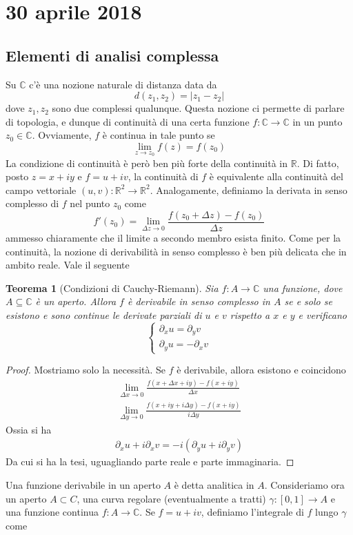 \documentclass[a4paper,11pt]{book}
\newcommand{\R}{\mathbb{R}}
\newcommand{\C}{\mathbb{C}}
\theoremstyle{theorem}
\newtheorem{teorema}{Teorema}[section]
\theoremstyle{definition}
\begin{document}
\section{30 aprile 2018}
\subsection{Elementi di analisi complessa}
Su $\C$ c'è una nozione naturale di distanza data da
\[d(z_1,z_2)=|z_1-z_2|\]
dove $z_1,z_2$ sono due complessi qualunque. Questa nozione ci permette di parlare di topologia, e dunque di continuità di una certa funzione $f\colon\C\to\C$ in un punto $z_0\in\C$. Ovviamente, $f$ è continua in tale punto se
\[\lim\limits_{z\to z_0}f(z)=f(z_0)\]
La condizione di continuità è però ben più forte della continuità in $\R$. Di fatto, posto $z=x+iy$ e $f=u+iv$, la continuità di $f$ è equivalente alla continuità del campo vettoriale $(u,v)\colon\R^2\to\R^2$. Analogamente, definiamo la derivata in senso complesso di $f$ nel punto $z_0$ come
\[f'(z_0)=\lim\limits_{\Delta z\to 0}\frac{f(z_0+\Delta z)-f(z_0)}{\Delta z}\]
ammesso chiaramente che il limite a secondo membro esista finito. Come per la continuità, la nozione di derivabilità in senso complesso è ben più delicata che in ambito reale. Vale il seguente
\begin{teorema}[Condizioni di Cauchy-Riemann]
	Sia $f\colon A\to\C$ una funzione, dove $A\subseteq\C$ è un aperto. Allora $f$ è derivabile in senso complesso in $A$ se e solo se esistono e sono continue le derivate parziali di $u$ e $v$ rispetto a $x$ e $y$ e verificano
	\[\begin{cases}
	\partial_xu=\partial_y{v}\\\partial_y{u}=-\partial_x{v}
	\end{cases}\]
\end{teorema}
\begin{proof}
	Mostriamo solo la necessità. Se $f$ è derivabile, allora esistono e coincidono
	\begin{align*}\lim\limits_{\Delta x\to 0}\frac{f(x+\Delta x+iy)-f(x+iy)}{\Delta x}\\\lim\limits_{\Delta y\to0}\frac{f(x+iy+i\Delta y)-f(x+iy)}{i\Delta y}\end{align*}
	Ossia si ha
	\begin{align*}
		\partial_xu+i\partial_xv=-i(\partial_yu+i\partial_yv)
	\end{align*}
	Da cui si ha la tesi, uguagliando parte reale e parte immaginaria.
\end{proof}
Una funzione derivabile in un aperto $A$ è detta analitica in $A$. Consideriamo ora un aperto $A\subset C$, una curva regolare (eventualmente a tratti) $\gamma\colon[0,1]\to A$ e una funzione continua $f\colon A\to\C$. Se $f=u+iv$, definiamo l'integrale di $f$ lungo $\gamma$ come
\end{document}
